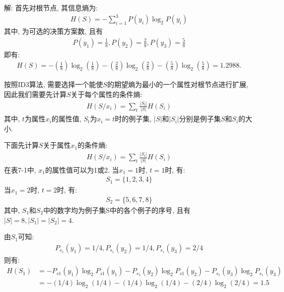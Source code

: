 解:  首先对根节点, 其信息熵为:
\begin{align}
  H(S)=-\sum_{i=1}^{3} P\left(y_{i}\right) \log_ {2} P\left(y_{i}\right)
\end{align}
其中, 为可选的决策方案数, 且有
\begin{align}
  P(y_1)=\frac 1 8, P(y_2)=\frac 2 8, P(y_3)=\frac 5 8
\end{align}
即有:
\begin{align}
    H(S)= -\left(\frac 1 8\right)\log_2 \left(\frac 1 8\right)- \left(\frac 2 8\right)\log_ 2\left(\frac 2 8 \right)- \left(\frac 5 8\right)\log_ 2\left(\frac 5 8\right) =1.2988.
\end{align}

按照ID3算法, 需要选择一个能使$S$的期望熵为最小的一个属性对根节点进行扩展, 因此我们需要先计算$S$关于每个属性的条件熵:
\begin{align}
  H\left(S / x_{i}\right)=\sum_{t} \frac{\left|S_{t}\right|}{|S|} H\left(S_{i}\right)
\end{align}
其中, $t$为属性$x_i$的属性值, $S_t$为$x_i=t$时的例子集, $|S|$和$|S_i|$分别是例子集$S$和$S_i$的大小.

下面先计算$S$关于属性$x_1$的条件熵:
\begin{align}
  H\left(S / x_{i}\right)=\sum_{t} \frac{\left|S_{t}\right|}{|S|} H\left(S_{i}\right)
\end{align}
在表7-1中, $x_1$的属性值可以为1或2. 当$x_1=1$时, $t=1$时, 有:
\begin{align}
  S_1=\{1, 2, 3, 4\}
\end{align}
当$x_1=2$时, $t=2$时, 有:
\begin{align}
  S_2=\{5, 6, 7, 8\}
\end{align}
其中, $S_1$和$S_2$中的数字均为例子集S中的各个例子的序号, 且有$|S|=8,|S_1|=|S_2|=4$.

由$S_1$可知:
\begin{align}
  P_{s_1}(y_1)=1/4,     P_{s_1}(y_2)=1/4,     P_{s_1}(y_3)=2/4
\end{align}
则有:
\begin{align}
H(S_1)&= - P_{s1}(y_1)\log_2 P_{s1}(y_1) - P_{s_1}(y_2)\log_2 P_{s1}(y_2 )- P_{s_1}(y_3)\log_2 P_{s_1}(y_3 )\\
     &= -(1/4)\log_2(1/4)- (1/4)\log_2(1/4)- (2/4)\log_2(2/4) =1.5
\end{align}


